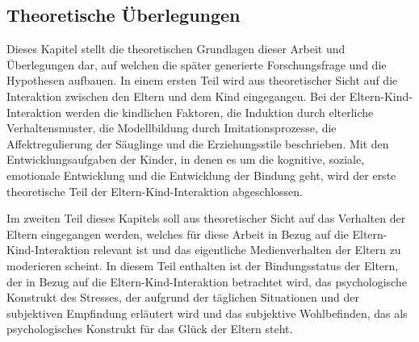 \subsection{Theoretische Überlegungen}\label{sec:TheretischeÜberlegungen}
Dieses Kapitel stellt die theoretischen Grundlagen dieser Arbeit und Überlegungen dar, auf welchen die später generierte Forschungsfrage und die Hypothesen aufbauen. 
In einem ersten Teil wird aus theoretischer Sicht auf die Interaktion zwischen den Eltern und dem Kind eingegangen. Bei der Eltern-Kind-Interaktion werden die kindlichen Faktoren, die Induktion durch elterliche Verhaltensmuster, die Modellbildung durch Imitationsprozesse, die Affektregulierung der Säuglinge und die Erziehungsstile beschrieben. Mit den Entwicklungsaufgaben der Kinder, in denen es um die kognitive, soziale, emotionale Entwicklung und die Entwicklung der Bindung geht, wird der erste theoretische Teil der Eltern-Kind-Interaktion abgeschlossen.

Im zweiten Teil dieses Kapitels soll aus theoretischer Sicht auf das Verhalten der Eltern eingegangen werden, welches für diese Arbeit in Bezug auf die Eltern-Kind-Interaktion relevant ist und das eigentliche Medienverhalten der Eltern zu moderieren scheint. In diesem Teil enthalten ist der Bindungsstatus der Eltern, der in Bezug auf die Eltern-Kind-Interaktion betrachtet wird, das psychologische Konstrukt des Stresses, der aufgrund der täglichen Situationen und der subjektiven Empfindung erläutert wird und das subjektive Wohlbefinden, das als psychologisches Konstrukt für das Glück der Eltern steht.


